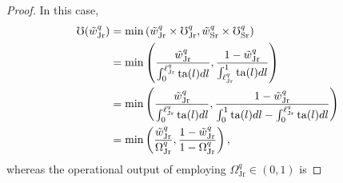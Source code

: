 \documentclass[hidelinks, nonatbib]{elsarticle}
\begin{document}
\begin{lemma}
\begin{proof}
        In this case,
        \begin{align}
            \mho(\tilde{w}_{\text{Jr}}^{q})
            &=
            \min\left(
                \tilde{w}_{\text{Jr}}^{q}
                \times
                \mho_{\text{Jr}}^{q}
                ,
                \tilde{w}_{\text{Sr}}^{q}
                \times
                \mho_{\text{Sr}}^{q}
            \right)
            \\
            &=
            \min\left(
                \frac{
                    \tilde{w}_{\text{Jr}}^{q}
                }{
                    \int_{0}^{
                        \ell_{\text{Jr}}^{q}
                    }{
                        \text{ta}(l)
                        dl
                    }
                }
                ,
                \frac{
                    1 - \tilde{w}_{\text{Jr}}^{q}
                }{
                    \int_{
                        \ell_{\text{Jr}}^{q}
                    }^{1}{
                        \text{ta}(l)
                        dl
                    }
                }
            \right)
            \\
            &=
            \min\left(
                \frac{
                    \tilde{w}_{\text{Jr}}^{q}
                }{
                    \int_{0}^{
                        \ell_{\text{Jr}}^{q}
                    }{
                        \text{ta}(l)
                        dl
                    }
                }
                ,
                \frac{
                    1 - \tilde{w}_{\text{Jr}}^{q}
                }{
                    \int_{0}^{1}{
                        \text{ta}(l)
                        dl
                    }
                    -
                    \int_{0}^{
                        \ell_{\text{Jr}}^{q}
                    }{
                        \text{ta}(l)
                        dl
                    }
                }
            \right)
            \\
            &=
            \min\left(
                \frac{
                    \tilde{w}_{\text{Jr}}^{q}
                }{
                    \Omega_{\text{Jr}}^{q}
                }
                ,
                \frac{
                    1 - \tilde{w}_{\text{Jr}}^{q}
                }{
                    1 - \Omega_{\text{Jr}}^{q}
                }
            \right)
            ,
        \end{align}
        whereas the operational output of employing $\Omega_{\text{Jr}}^{q} \in (0,1)$ is

\end{proof}
\end{lemma}
\end{document}
